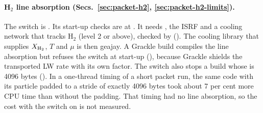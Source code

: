 \paragraph{H$_2$ line absorption (Secs.~\ref{sec:packet-h2}, \ref{sec:packet-h2-limits}).}
The switch is . Its start-up
checks are at .
It needs , the ISRF and a cooling network
that tracks H$_2$ (level 2 or above), checked by
(). The cooling library
that supplies $X_{{\rm H}_2}$, $T$ and $\mu$ is then geajay. A Grackle build
compiles the line absorption but refuses the switch at start-up
(), because Grackle shields the
transported LW rate with its own factor. The switch also stops a build whose
 is 4096 bytes (). In a one-thread timing of a short
packet run, the same code with its particle padded to a stride of exactly 4096
bytes took about 7 per cent more CPU time than without the padding. That timing
had no line absorption, so the cost with the switch on is not measured.

